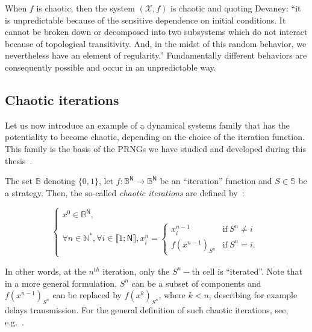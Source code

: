 When $f$ is chaotic, then the system $(\mathcal{X}, f)$ is chaotic and quoting Devaney: ``it is unpredictable because of the sensitive dependence on initial conditions. It cannot be broken down or decomposed into two subsystems which do not interact because of topological transitivity. And, in the midst of this random behavior, we nevertheless have an element of regularity.'' Fundamentally different behaviors are consequently possible and occur in an unpredictable way.






\subsection{Chaotic iterations}
\label{subsection:Chaotic iterations}

Let us now introduce an example of a dynamical systems family that has
the potentiality to become chaotic, depending on the choice of the iteration 
function. This family is the basis of the PRNGs we have studied and
developed during this thesis~\cite{GuyeuxThese10,bibtexwangqianxue}.

\begin{definition}
\label{Chaotic iterations}
The set $\mathds{B}$ denoting $\{0,1\}$, let $f:\mathds{B}^{\mathsf{N}%
}\longrightarrow \mathds{B}^{\mathsf{N}}$ be an ``iteration'' function and $S\in \mathbb{S}
$ be a strategy. Then, the so-called \emph{chaotic iterations} are defined by~\cite{Robert1986}:

\begin{equation}
\left\{\begin{array}{l}
x^0\in \mathds{B}^{\mathsf{N}}, \\
\forall n\in \mathds{N}^{\ast },\forall i\in \llbracket1;\mathsf{N}\rrbracket%
,x_i^n=
\left\{
\begin{array}{ll}
x_i^{n-1} & \text{if}~S^n\neq i \\
f(x^{n-1})_{S^n}  & \text{if}~S^n=i.
\end{array} 
\right. 
\end{array}
\right.
\end{equation}
\end{definition}

In other words, at the $n^{th}$ iteration, only the $S^{n}-$th cell is
\textquotedblleft iterated\textquotedblright . Note that in a more general
formulation, $S^n$ can be a subset of components and $f(x^{n-1})_{S^{n}}$ can
be replaced by $f(x^{k})_{S^{n}}$, where $k < n$, describing for
example delays transmission. For the
general definition of such chaotic iterations, see, e.g.~\cite{Robert1986}.

